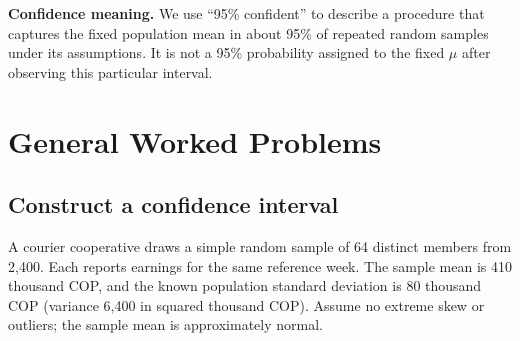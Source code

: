 \textbf{Confidence meaning.} We use ``95\% confident'' to describe a procedure that captures the fixed population mean in about 95\% of repeated random samples under its assumptions. It is not a 95\% probability assigned to the fixed $\mu$ after observing this particular interval.

\clearpage
\section{General Worked Problems}\label{sec:general-worked}
\label{sec:worked-solution-examples}

\subsection{Construct a confidence interval}\label{prob:c4-1}
A courier cooperative draws a simple random sample of 64 distinct members from 2,400. Each reports earnings for the same reference week. The sample mean is 410 thousand COP, and the known population standard deviation is 80 thousand COP (variance 6,400 in squared thousand COP). Assume no extreme skew or outliers; the sample mean is approximately normal.
